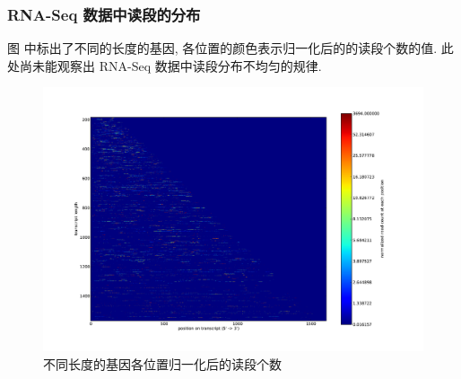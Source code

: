 \subsubsection{RNA-Seq 数据中读段的分布}
图 \cite{nonunif-read-locations} 中标出了不同的长度的基因, 
各位置的颜色表示归一化后的的读段个数的值. 
此处尚未能观察出 RNA-Seq 数据中读段分布不均匀的规律. 

\begin{figure}[!t]
\centering
\includegraphics[width=\textwidth]{figures/nonunif/isof_len-vs-reads_distr.pdf}
\caption{不同长度的基因各位置归一化后的读段个数}
\label{nonunif-read-locations}
\end{figure}






